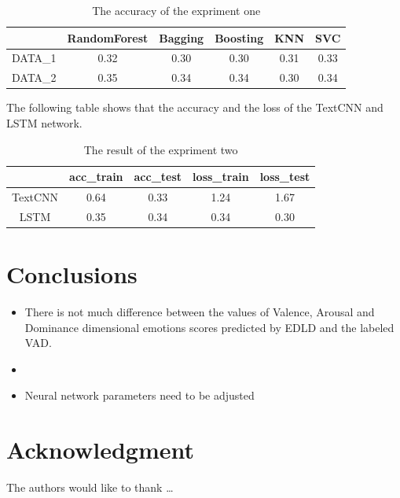 \begin{table} [htbp] \centering
  \caption{The accuracy of the expriment one}
  \label{tbl:overall-experiments}
  \begin{tabular}{cccccc}
\toprule
 & RandomForest  & Bagging & Boosting & KNN & SVC\\
\midrule
DATA\_1&  0.32 &  0.30 &  0.30 & 0.31 & 0.33\\
DATA\_2 &  0.35 &  0.34 &  0.34 & 0.30 & 0.34\\
\bottomrule
\end{tabular}
\end{table}

The following table shows that
the accuracy and the loss of 
the TextCNN and LSTM network.

\begin{table} [htbp] \centering
	\caption{The result of the expriment two}
	\label{tbl:overall-experiments}
	\begin{tabular}{ccccc}
	\toprule
	& acc_train  & acc_test & loss_train & loss_test \\
	\midrule
	TextCNN&  0.64 &  0.33 &  1.24 & 1.67 \\
	LSTM &  0.35 &  0.34 &  0.34 & 0.30 \\
	\bottomrule
	\end{tabular}
\end{table}




\section{Conclusions} \label{sec-conclusions}

\begin{itemize}
	\item
	\smallskip
	There is not much difference between 
	the values of Valence, Arousal and Dominance 
	dimensional emotions scores predicted by EDLD
	and the labeled VAD.
	
	\smallskip
	
	\item
	\smallskip
	
	
	\item
	\smallskip
	Neural network parameters need to be adjusted
\end{itemize}


\section*{Acknowledgment}

\lipsum[1]


The authors would like to thank \ldots

